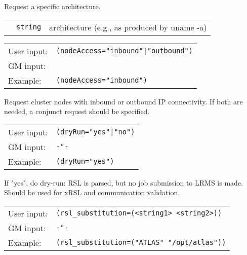   Request a specific architecture.

  \begin{tabular}{llp{10cm}}
    \hspace*{1cm}&\texttt{string} & architecture  (e.g., as produced by uname -a)\\
  \end{tabular}

  \hspace*{0.5cm}
  \begin{shaded}
  \end{shaded}
  \begin{tabular}{lp{13cm}}
    User input:&\verb#(nodeAccess="inbound"|"outbound")#\\
    GM input:&\\
    Example:&\verb#(nodeAccess="inbound")#\\
  \end{tabular}

  Request cluster nodes with inbound or outbound IP connectivity. If
  both are needed, a conjunct request should be specified.

  \hspace*{0.5cm}
  \begin{shaded}
  \end{shaded}
  \begin{tabular}{lp{13cm}}
    User input:&\verb#(dryRun="yes"|"no")#\\
    GM input:&\verb#-"-#\\
    Example:&\verb#(dryRun="yes")#\\
  \end{tabular}

  If "yes", do dry-run: RSL is parsed, but no job submission to LRMS
  is made. Should be used for xRSL and communication validation.

  \hspace*{0.5cm}
  \begin{shaded}
  \end{shaded}
  \begin{tabular}{lp{13cm}}
    User input:&\verb#(rsl_substitution=(<string1> <string2>))#\\
    GM input:&\verb#-"-#\\
    Example:&\verb#(rsl_substitution=("ATLAS" "/opt/atlas"))#\\
  \end{tabular}


